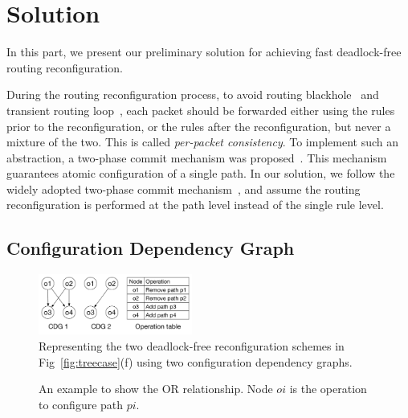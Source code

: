 \section{Solution}\label{sec:solution}

In this part, we present our preliminary solution for achieving fast deadlock-free routing reconfiguration.

During the routing reconfiguration process, to avoid routing blackhole~\cite{everflow} and transient routing loop~\cite{dionysus}, each packet should be forwarded either using the rules prior to the reconfiguration, or the rules after the reconfiguration, but never a mixture of the two. This is called \textit{per-packet consistency}. To implement such an abstraction, a two-phase commit mechanism was proposed~\cite{abstractionforupdate}. This mechanism guarantees atomic configuration of a single path. In our solution, we follow the widely adopted two-phase commit mechanism~\cite{abstractionforupdate,zupdate,dionysus}, and assume the routing reconfiguration is performed at the path level instead of the single rule level.


\subsection{Configuration Dependency Graph}\label{subsec:cdg}

\begin{figure}[t]
	\centering
	\includegraphics[width=0.45\textwidth] {figs/CDG}
	\caption{Representing the two deadlock-free reconfiguration schemes in Fig~\ref{fig:treecase}(f) using two configuration dependency graphs.}\label{fig:cdg}
\end{figure}

\begin{figure}[t]
	\centering
	
	
	
	\caption{An example to show the OR relationship. Node $oi$ is the operation to configure path $pi$.}\label{fig:orrelationship}
	
\end{figure}

